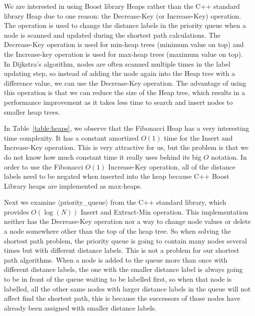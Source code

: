 We are interested in using Boost library Heaps rather than the C++ standard library Heap due to one reason:
the Decrease-Key (or Increase-Key) operation.
The operation is used to change the distance labels in the priority queue when a node is scanned and updated during the shortest path calculations.
The Decrease-Key operation is used for min-heap trees (minimum value on top) and the Increase-key operation is used for max-heap trees (maximum value on top).
In Dijkstra's algorithm,
nodes are often scanned multiple times in the label updating step,
so instead of adding the node again into the Heap tree with a difference value,
we can use the Decrease-Key operation.
The advantage of using this operation is that we can reduce the size of the Heap tree, which results in a performance improvement as it takes less time to search and insert nodes to smaller heap trees.

In Table~\ref{table:heaps},
we observe that the Fibonacci Heap has a very interesting time complexity.
It has a constant amortized $O(1)$ time for the Insert and Increase-Key operation.
This is very attractive for us,
but the problem is that we do not know how much constant time it really uses behind its big $O$ notation.
In order to use the Fibonacci $O(1)$ Increase-Key operation,
all of the distance labels need to be negated when inserted into the heap because C++ Boost Library heaps are implemented as max-heaps.

Next we examine $\langle$priority\_queue$\rangle$ from the C++ standard library,
which provides $O(\log(N))$ Insert and Extract-Min operation.
This implementation neither has the Decrease-Key operation nor a way to change node values or delete a node somewhere other than the top of the heap tree.
So when solving the shortest path problem,
the priority queue is going to contain many nodes several times but with different distance labels.
This is not a problem for our shortest path algorithms.
When a node is added to the queue more than once with different distance labels,
the one with the smaller distance label is always going to be in front of the queue waiting to be labelled first,
so when that node is labelled,
all the other same nodes with larger distance labels in the queue will not affect find the shortest path,
this is because the successors of those nodes have already been assigned with smaller distance labels.

